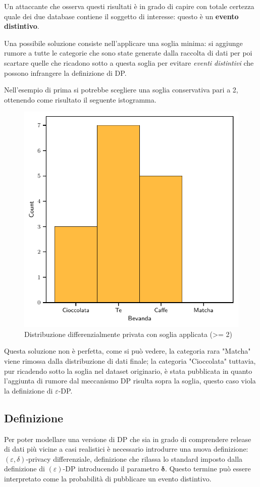 Un attaccante che osserva questi risultati è in grado di capire con totale certezza quale dei due database contiene il soggetto di interesse: questo è un \textbf{evento distintivo}.

Una possibile soluzione consiste nell'applicare una soglia minima: si aggiunge rumore a tutte le categorie che sono state generate dalla raccolta di dati per poi scartare quelle che ricadono sotto a questa soglia per evitare \textit{eventi distintivi} che possono infrangere la definizione di DP.

Nell'esempio di prima si potrebbe scegliere una soglia conservativa pari a 2, ottenendo come risultato il seguente istogramma.

\begin{figure}[H]
    \centering
    \includegraphics[width=.4\linewidth]{plots/drink_histogram_yes_matcha_threshold.pdf}
    \caption{Distribuzione differenzialmente privata con soglia applicata (>= 2)}
\end{figure}

Questa soluzione non è perfetta, come si può vedere, la categoria rara "Matcha" viene rimossa dalla distribuzione di dati finale; la categoria "Cioccolata" tuttavia, pur ricadendo sotto la soglia nel dataset originario, è stata pubblicata in quanto l'aggiunta di rumore dal meccanismo DP risulta sopra la soglia, questo caso viola la definizione di $\varepsilon$-DP.

\subsection{Definizione}
Per poter modellare una versione di DP che sia in grado di comprendere release di dati più vicine a casi realistici è necessario introdurre una nuova definizione: $(\varepsilon, \delta)$-privacy differenziale, definizione che rilassa lo standard imposto dalla definizione di $(\varepsilon)$-DP introducendo il parametro $\boldsymbol{\delta}$. Questo termine può essere interpretato come la probabilità di pubblicare un evento distintivo.

